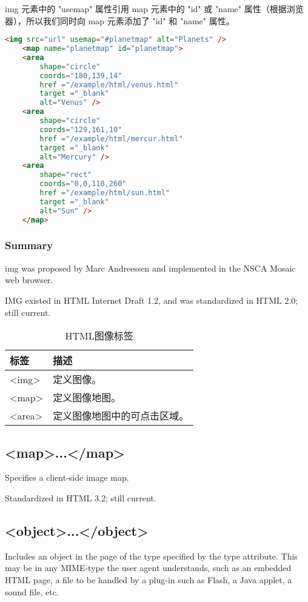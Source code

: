 img 元素中的 "usemap" 属性引用 map 元素中的 "id" 或 "name" 属性（根据浏览器），所以我们同时向 map 元素添加了 "id" 和 "name" 属性。

\begin{lstlisting}[language=HTML]
	<img src="url" usemap="#planetmap" alt="Planets" />
	<map name="planetmap" id="planetmap">
	<area
		shape="circle"
		coords="180,139,14"
		href ="/example/html/venus.html"
		target ="_blank"
		alt="Venus" />
	<area
		shape="circle"
		coords="129,161,10"
		href ="/example/html/mercur.html"
		target ="_blank"
		alt="Mercury" />
	<area
		shape="rect"
		coords="0,0,110,260"
		href ="/example/html/sun.html"
		target ="_blank"
		alt="Sun" />
	</map>
\end{lstlisting}




\subsubsection{Summary}

img was proposed by Marc Andreessen and implemented in the NSCA Mosaic web browser.

IMG existed in HTML Internet Draft 1.2, and was standardized in HTML 2.0; still current.

\begin{table}[!h]
\centering
\caption{HTML图像标签}
\begin{tabular}{|l|l|}
\hline
标签		&描述						\\
\hline
<img>	&定义图像。					\\
\hline
<map>	&定义图像地图。				\\
\hline
<area>	&定义图像地图中的可点击区域。	\\
\hline
\end{tabular}
\end{table}


\subsection{<map>...</map>}

Specifies a client-side image map.

Standardized in HTML 3.2; still current.




\subsection{<object>...</object>}


Includes an object in the page of the type specified by the type attribute. This may be in any MIME-type the user agent understands, such as an embedded HTML page, a file to be handled by a plug-in such as Flash, a Java applet, a sound file, etc.



